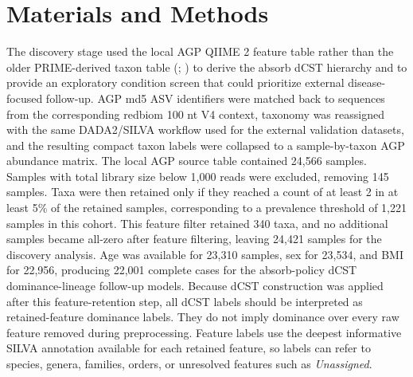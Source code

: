 \documentclass[
  11pt,
]{article}
\begin{document}
\section{Materials and Methods}\label{methods}

The discovery stage used the local AGP QIIME 2 feature table rather
than the older PRIME-derived taxon table
(;
) to derive the absorb
dCST hierarchy and to provide an exploratory condition screen that
could prioritize external disease-focused follow-up. AGP md5 ASV
identifiers were matched back to sequences from the corresponding
redbiom 100 nt V4 context, taxonomy was reassigned with the same
DADA2/SILVA workflow used for the external validation datasets, and the
resulting compact taxon labels were collapsed to a sample-by-taxon AGP
abundance matrix. The local AGP source table contained 24,566 samples.
Samples with total library size below 1,000 reads were excluded,
removing 145 samples. Taxa were then retained only if they reached a
count of at least 2 in at least 5\% of the retained samples,
corresponding to a prevalence threshold of 1,221 samples in this
cohort. This feature filter retained 340 taxa, and no additional
samples became all-zero after feature filtering, leaving 24,421 samples
for the discovery analysis. Age was available for 23,310 samples, sex
for 23,534, and BMI for 22,956, producing 22,001 complete cases for the
absorb-policy dCST dominance-lineage follow-up models. Because dCST construction was
applied after this feature-retention step, all dCST labels should be
interpreted as retained-feature dominance labels. They do not imply
dominance over every raw feature removed during preprocessing. Feature
labels use the deepest informative SILVA annotation available for each
retained feature, so labels can refer to species, genera, families,
orders, or unresolved features such as \emph{Unassigned}.
\end{document}
